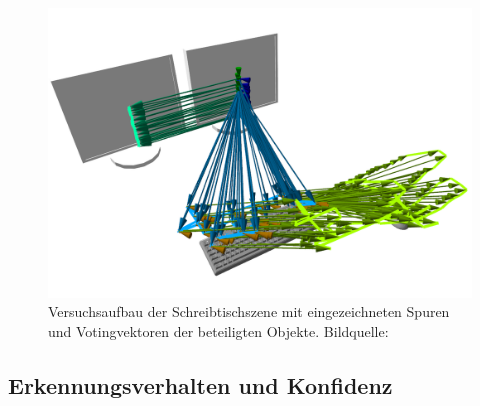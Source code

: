 \begin{figure}
  \centering
  \includegraphics[width=0.7\linewidth]{bilder/paper_fotos/training-data.png}
  \caption{Versuchsaufbau der Schreibtischszene mit eingezeichneten Spuren und Votingvektoren der beteiligten Objekte. Bildquelle: \cite{P.MeissnerandR.RecklingandR.JaekelandS.R.Schmidt-RohrandR.Dillmann2013}}
  \label{fig:schreibtisch-record-data}
\end{figure}

\subsection{Erkennungsverhalten und Konfidenz}

